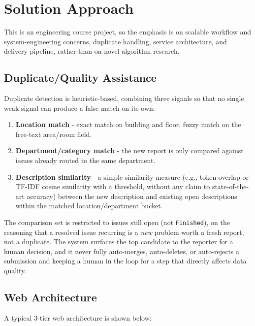 \documentclass[11pt,a4paper]{article}
\begin{document}
\section{Solution Approach}

This is an engineering course project, so the emphasis is on scalable
workflow and system-engineering concerns, duplicate handling, service
architecture, and delivery pipeline, rather than on novel algorithm
research.

\subsection{Duplicate/Quality Assistance}
Duplicate detection is heuristic-based, combining three signals so that
no single weak signal can produce a false match on its own:

\begin{enumerate}[leftmargin=0.7cm]
  \item \textbf{Location match} - exact match on building and floor,
    fuzzy match on the free-text area/room field.
  \item \textbf{Department/category match} - the new report is only
    compared against issues already routed to the same department.
  \item \textbf{Description similarity} - a simple similarity measure
    (e.g., token overlap or TF-IDF cosine similarity with a threshold,
    without any claim to state-of-the-art accuracy) between the new
    description and existing open descriptions within the matched
    location/department bucket.
\end{enumerate}

\noindent The comparison set is restricted to issues still open (not
\texttt{Finished}), on the reasoning that a resolved issue recurring is a
\emph{new} problem worth a fresh report, not a duplicate. The system
surfaces the top candidate to the reporter for a human decision, and it
never fully auto-merges, auto-deletes, or auto-rejects a submission and 
keeping a human in the loop for a step that directly affects data
quality.

\subsection{Web Architecture}

A typical 3-tier web architecture is shown below:
\end{document}
